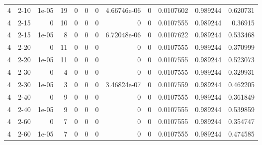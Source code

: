 \begin{tabular}{rlrrrrrrrrrr}
     4 & 2-10   &      1e-05 &          19 &                 0 &                 0 &     0           &     4.66746e-06 &      0           &        0.0107602 &               0.989244 &           0.620731 \\
     4 & 2-15   &      0     &          10 &                 0 &                 0 &     0           &     0           &      0           &        0.0107555 &               0.989244 &           0.36915  \\
     4 & 2-15   &      1e-05 &           8 &                 0 &                 0 &     0           &     6.72048e-06 &      0           &        0.0107622 &               0.989244 &           0.533468 \\
     4 & 2-20   &      0     &          11 &                 0 &                 0 &     0           &     0           &      0           &        0.0107555 &               0.989244 &           0.370999 \\
     4 & 2-20   &      1e-05 &          11 &                 0 &                 0 &     0           &     0           &      0           &        0.0107555 &               0.989244 &           0.523073 \\
     4 & 2-30   &      0     &           4 &                 0 &                 0 &     0           &     0           &      0           &        0.0107555 &               0.989244 &           0.329931 \\
     4 & 2-30   &      1e-05 &           3 &                 0 &                 0 &     0           &     3.46824e-07 &      0           &        0.0107559 &               0.989244 &           0.462205 \\
     4 & 2-40   &      0     &           9 &                 0 &                 0 &     0           &     0           &      0           &        0.0107555 &               0.989244 &           0.361849 \\
     4 & 2-40   &      1e-05 &           9 &                 0 &                 0 &     0           &     0           &      0           &        0.0107555 &               0.989244 &           0.539859 \\
     4 & 2-60   &      0     &           7 &                 0 &                 0 &     0           &     0           &      0           &        0.0107555 &               0.989244 &           0.354747 \\
     4 & 2-60   &      1e-05 &           7 &                 0 &                 0 &     0           &     0           &      0           &        0.0107555 &               0.989244 &           0.474585 \\

\end{tabular}
